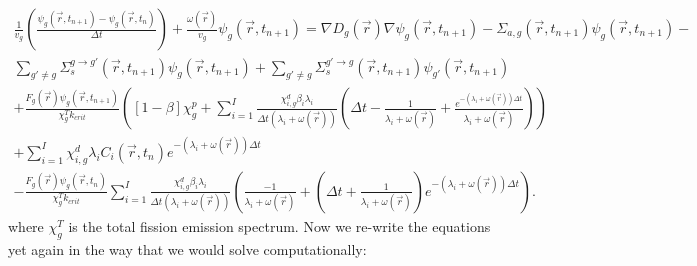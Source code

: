 \documentclass[12pt]{report}
\begin{document}
	\begin{eqnarray}
	\frac{1}{v_g} \left(\frac{\psi_g(\vec{r},t_{n+1}) - \psi_g(\vec{r},t_{n})}{\Delta t} \right) + \frac{\omega(\vec{r})}{v_g} \psi_g(\vec{r},t_{n+1})  = \nabla D_g(\vec{r}) \nabla \psi_g(\vec{r},t_{n+1}) - \Sigma_{a,g}(\vec{r},t_{n+1}) \psi_g(\vec{r},t_{n+1}) -  \nonumber \\ \sum_{g'\neq g} \Sigma_{s}^{g\rightarrow g'} (\vec{r},t_{n+1}) \psi_g(\vec{r},t_{n+1}) + \sum_{g' \neq g} \Sigma_{s}^{g'\rightarrow g} (\vec{r},t_{n+1}) \psi_{g'}(\vec{r},t_{n+1}) \nonumber \\
	+ \frac{F_g(\vec{r}) \psi_g(\vec{r},t_{n+1})}{\chi_g^T k_{crit}}  \left(\left[ 1- \beta \right] \chi_g^p + \sum_{i=1}^{I} \frac{\chi_{i,g}^d \beta_i \lambda_i}{\Delta t \left( \lambda_i + \omega(\vec{r}) \right)} \left( \Delta t - \frac{1}{\lambda_i + \omega(\vec{r})} + \frac{e^{-\left( \lambda_i + \omega(\vec{r}) \right) \Delta t}}{\lambda_i + \omega(\vec{r})}\right) \right) \nonumber \\ +  \sum_{i=1}^{I} \chi_{i,g}^d \lambda_i C_i(\vec{r},t_{n}) e^{-\left(\lambda_i + \omega(\vec{r})\right) \Delta t} \nonumber \\
	-  \frac{F_g(\vec{r}) \psi_g(\vec{r},t_{n})}{\chi_g^T k_{crit}}  \sum_{i=1}^{I} \frac{\chi_{i,g}^d \beta_i \lambda_i}{\Delta t \left( \lambda_i + \omega(\vec{r}) \right)} \left( \frac{-1}{\lambda_i + \omega(\vec{r})} + \left(\Delta t + \frac{1}{\lambda_i + \omega(\vec{r})} \right)e^{-\left(\lambda_i + \omega(\vec{r}) \right) \Delta t} \right)
	\nonumber.
	\end{eqnarray}
	where $\chi_g^T$ is the total fission emission spectrum. Now we re-write the equations yet again in the way that we would solve computationally:
\end{document}
